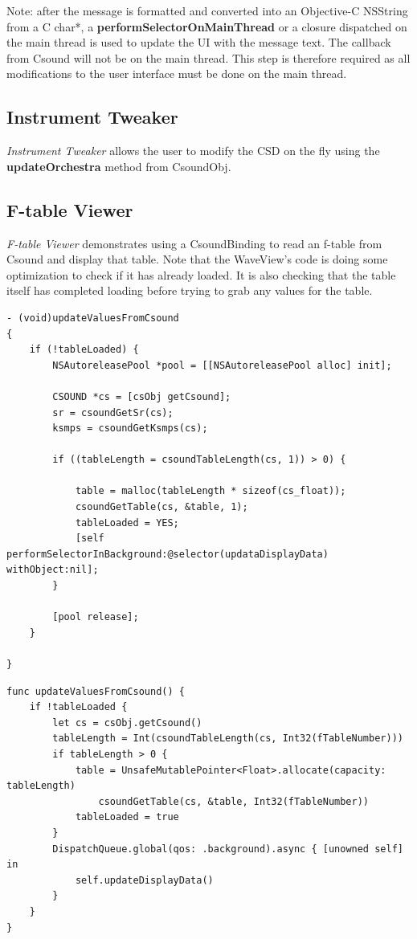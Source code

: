 \documentclass[11pt]{article}
\begin{document}
Note: after the message is formatted and converted into an Objective-C NSString from a C char*, a \textbf{performSelectorOnMainThread} or a closure dispatched on the main thread is used to update the UI with the message text.  The callback from Csound will not be on the main thread. This step is therefore required as all modifications to the user interface must be done on the main thread.

\subsection{Instrument Tweaker}

\emph{Instrument Tweaker} allows the user to modify the CSD on the fly using the \textbf{updateOrchestra} method from CsoundObj. 

\subsection{F-table Viewer}

\emph{F-table Viewer} demonstrates using a CsoundBinding to read an f-table from Csound and display that table.  Note that the WaveView's code is doing some optimization to check if it has already loaded.  It is also checking that the table itself has completed loading before trying to grab any values for the table.

\begin{lstlisting}[caption=Waveview code demonstrating reading f-tables from Csound]
- (void)updateValuesFromCsound
{
    if (!tableLoaded) {
        NSAutoreleasePool *pool = [[NSAutoreleasePool alloc] init];

        CSOUND *cs = [csObj getCsound];
        sr = csoundGetSr(cs);
        ksmps = csoundGetKsmps(cs);

        if ((tableLength = csoundTableLength(cs, 1)) > 0) {

            table = malloc(tableLength * sizeof(cs_float));
            csoundGetTable(cs, &table, 1);
            tableLoaded = YES;
            [self performSelectorInBackground:@selector(updataDisplayData) withObject:nil];
        }

        [pool release];
    }

}
\end{lstlisting}

\pagebreak
\begin{lstlisting}[caption=Equivalent example in Swift 3]
func updateValuesFromCsound() {
    if !tableLoaded {
        let cs = csObj.getCsound()
        tableLength = Int(csoundTableLength(cs, Int32(fTableNumber)))
        if tableLength > 0 {
            table = UnsafeMutablePointer<Float>.allocate(capacity: tableLength)
                csoundGetTable(cs, &table, Int32(fTableNumber))
            tableLoaded = true
        }
        DispatchQueue.global(qos: .background).async { [unowned self] in
            self.updateDisplayData()
        }
    }
}
\end{lstlisting}
\end{document}
